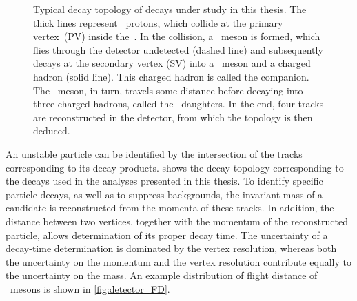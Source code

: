 \begin{figure}[htb] \centerfloat
    \caption{
        Typical decay topology of decays under study in this thesis.
        The thick lines represent \lhc~protons, which collide at the primary vertex~(PV) inside the~\velo.
        In the collision, a \Bs~meson is formed, which flies through the detector undetected (dashed line) and subsequently decays at the secondary vertex (SV) into a \Dspm~meson and a charged hadron (solid line).
        This charged hadron is called the companion.
        The \Dspm~meson, in turn, travels some distance before decaying into three charged hadrons, called the \Dspm~daughters.
        In the end, four tracks are reconstructed in the detector, from which the topology is then deduced.}
    \label{fig:detector_topology}
\end{figure}

An unstable particle can be identified by the intersection of the tracks corresponding to its decay products.
 shows the decay topology corresponding to the decays used in the analyses presented in this thesis.
To identify specific particle decays, as well as to suppress backgrounds, the invariant mass of a candidate is reconstructed from the momenta of these tracks.
In addition, the distance between two vertices, together with the momentum of the reconstructed particle, allows determination of its proper decay time.
The uncertainty of a decay-time determination is dominated by the vertex resolution, whereas both the uncertainty on the momentum and the vertex resolution contribute equally to the uncertainty on the mass.
An example distribution of flight distance of \bquark~mesons is shown in \cref{fig:detector_FD}.

